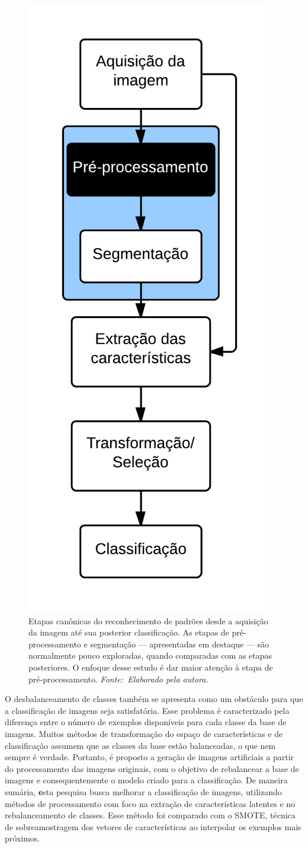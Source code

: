 \begin{figure}[!ht]
 \begin{center}
   \includegraphics[width=0.3\linewidth]{figuras/flow.png}
 \end{center}
 \caption[Etapas canônicas do reconhecimento de padrões desde a aquisição da imagem até sua posterior classificação.]{Etapas canônicas do reconhecimento de padrões desde a aquisição da imagem até sua posterior classificação. As etapas de pré-processamento e segmentação --- apresentadas em destaque --- são normalmente pouco exploradas, quando comparadas com as etapas posteriores. O enfoque desse estudo é dar maior atenção à etapa de pré-processamento. \textit{Fonte:~Elaborado pela autora.}}
 \label{fig:fluxo}
\end{figure}

\enlargethispage{-\baselineskip}

O desbalanceamento de classes também se apresenta como um obstáculo para que a classificação de imagens seja satisfatória. Esse problema é caracterizado pela diferença entre o número de exemplos disponíveis para cada classe da base de imagens. Muitos métodos de transformação do espaço de características e de classificação assumem que as classes da base estão balanceadas, o que nem sempre é verdade. Portanto, é proposto a geração de imagens artificiais a partir do processamento das imagens originais, com o objetivo de rebalancear a base de imagens e consequentemente o modelo criado para a classificação. De maneira sumária, {\textbf esta pesquisa busca melhorar a classificação de imagens, utilizando métodos de processamento com foco na extração de características latentes e no rebalanceamento de classes.} Esse método foi comparado com o SMOTE, técnica de sobreamostragem dos vetores de características ao interpolar os exemplos mais próximos.

